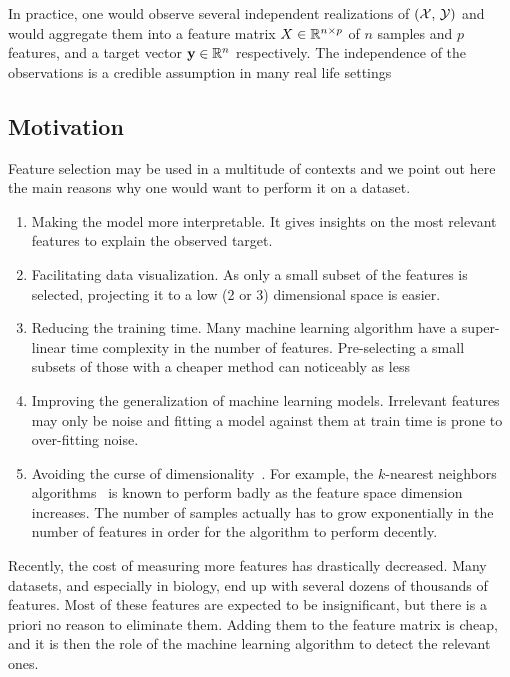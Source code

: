 In practice, one would observe several independent realizations of
$\left( \mathcal{X},\, \mathcal{Y} \right)$ and would aggregate them into a feature matrix
$X \in \mathbb{R}^{n \times p}$ of $n$ samples and $p$ features, and a target vector $\mathbf{y} \in \mathbb{R}^n$ respectively.
The independence of the observations is a credible assumption in many real life settings

\subsection{Motivation}\label{subsec:fs_motivation}

Feature selection may be used in a multitude of contexts and we point out here the main reasons why
one would want to perform it on a dataset.
\begin{enumerate}
    \item Making the model more interpretable.
    It gives insights on the most relevant features to explain the observed target.
    \item Facilitating data visualization.
    As only a small subset of the features is selected,
    projecting it to a low (2 or 3) dimensional space is easier.
    \item Reducing the training time.
    Many machine learning algorithm have a super-linear time complexity in the number of features.
    Pre-selecting a small subsets of those with a cheaper method can noticeably as less\cite{high_dimensional_fs}
    \item Improving the generalization of machine learning models.
    Irrelevant features may only be noise and fitting a model against them at train time
    is prone to over-fitting noise.
    \item Avoiding the curse of dimensionality~\cite{curse_dimensionality}.
    For example, the $k$-nearest neighbors algorithms~\cite{knn} is known to perform badly as the feature space
    dimension increases.
    The number of samples actually has to grow exponentially in the number of features in order for the algorithm
    to perform decently.
\end{enumerate}
Recently, the cost of measuring more features has drastically decreased.
Many datasets, and especially in biology, end up with several dozens of thousands of features.
Most of these features are expected to be insignificant, but there is a priori no reason to eliminate them.
Adding them to the feature matrix is cheap, and it is then the role of the machine learning algorithm
to detect the relevant ones.

